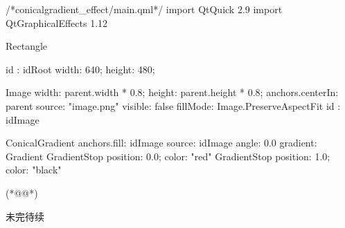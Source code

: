 \label{f000060}    %
\FloatBarrier                                  %
\begin{thebookfilesourceone}[escapeinside={(*@}{@*)},
caption=GoodLuck,
title=\filesourcenumbernameone \thefilesourcenumber
]
/*conicalgradient_effect/main.qml*/
import QtQuick 2.9
import QtGraphicalEffects 1.12

Rectangle {
    id : idRoot
    width: 640;
    height: 480;

    Image{
        width: parent.width * 0.8;
        height: parent.height * 0.8;
        anchors.centerIn: parent
        source: "image.png"
        visible: false
        fillMode: Image.PreserveAspectFit
        id : idImage
    }

    ConicalGradient {
        anchors.fill: idImage
        source: idImage
        angle: 0.0
        gradient: Gradient {
            GradientStop { position: 0.0; color: "red" }
            GradientStop { position: 1.0; color: "black" }
        }
    }

}(*@\marginpar[\hfill\setlength\fboxsep{2pt}\fbox{\footnotesize{\kaishu\parbox{1em}{\setlength{\baselineskip}{2pt}\filesourcenumbernameone}}\footnotesize{\thefilesourcenumber}}]{\setlength\fboxsep{2pt}\fbox{\footnotesize{\kaishu\parbox{1em}{\setlength{\baselineskip}{2pt}\filesourcenumbernameone}}\footnotesize{\thefilesourcenumber}}}@*)\end{thebookfilesourceone}          %
\addtocounter{lstlisting}{-1}   %


未完待续










